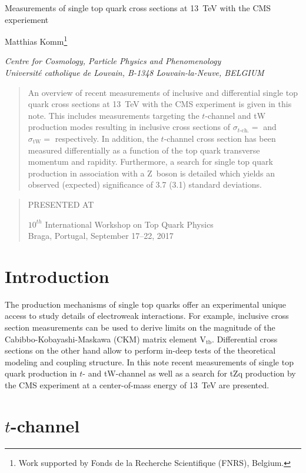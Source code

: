 \documentclass[12pt]{article}
\newcommand\pubnumber{}
\newcommand\pubdate{\today}
\def\institute{Centre for Cosmology, Particle Physics and Phenomenology\\
Universit\'e catholique de Louvain, B-1348 Louvain-la-Neuve, BELGIUM}
\def\support{\footnote{Work supported by Fonds de la Recherche Scientifique (FNRS), Belgium.}}
\def\Title#1{\begin{center} {\Large #1 } \end{center}}
\def\Author#1{\begin{center}{ \sc #1} \end{center}}
\def\Address#1{\begin{center}{ \it #1} \end{center}}
\newcommand\pubblock{\rightline{\begin{tabular}{l} \pubnumber\\
         \pubdate  \end{tabular}}}
\newenvironment{Abstract}{\begin{quotation}  }{\end{quotation}}
\newenvironment{Presented}{\begin{quotation} \begin{center} 
             PRESENTED AT\end{center}\bigskip 
      \begin{center}\begin{large}}{\end{large}\end{center} \end{quotation}}
\begin{document}
\begin{titlepage}
\pubblock

\vfill
\Title{Measurements of single top quark cross sections at 13~TeV with the CMS experiement}
\vfill
\Author{Matthias Komm\support}
\Address{\institute}
\vfill
\begin{Abstract}
An overview of recent measurements of inclusive and differential single top quark cross sections at 13~TeV with the CMS experiment is given in this note. This includes measurements targeting the $t$-channel and tW production modes resulting in inclusive cross sections of $\sigma_{t\mathrm{\mbox{-}ch.}}=$ and $\sigma_\mathrm{tW}=$ respectively. In addition, the $t$-channel cross section has been measured differentially as a function of the top quark transverse momentum and rapidity. Furthermore, a search for single top quark production in association with a Z~boson is detailed which yields an observed (expected) significance of 3.7 (3.1) standard deviations. 
\end{Abstract}
\vfill
\begin{Presented}
$10^{th}$ International Workshop on Top Quark Physics\\
Braga, Portugal,  September 17--22, 2017
\end{Presented}
\vfill
\end{titlepage}
\def\thefootnote{\fnsymbol{footnote}}
\setcounter{footnote}{0}
%

\section{Introduction}

The production mechanisms of single top quarks offer an experimental unique access to study details of electroweak interactions. For example, inclusive cross section measurements can be used to derive limits on the magnitude of the Cabibbo-Kobayashi-Maskawa (CKM) matrix element $\mathrm{V}_\mathrm{tb}$. Differential cross sections on the other hand allow to perform in-deep tests of the theoretical modeling and coupling structure. In this note recent measurements of single top quark production in $t$- and tW-channel as well as a search for tZq production by the CMS experiment at a center-of-mass energy of 13~TeV are presented.

\section{$t$-channel}
\end{document}
